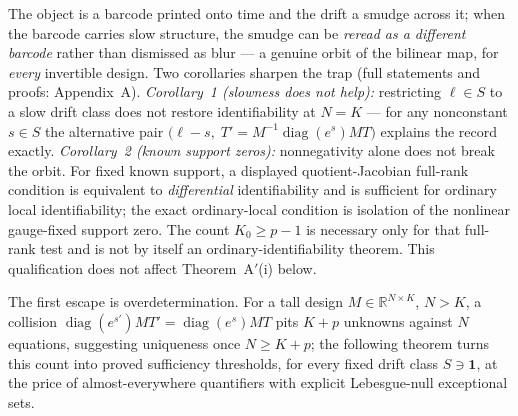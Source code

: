 The object is a barcode printed onto time and the drift a smudge across it; when the barcode carries slow structure, the smudge can be \emph{reread as a different barcode} rather than dismissed as blur --- a genuine orbit of the bilinear map, for \emph{every} invertible design. Two corollaries sharpen the trap (full statements and proofs: Appendix~A). \emph{Corollary~1 (slowness does not help):} restricting $\ell\in S$ to a slow drift class does not restore identifiability at $N=K$ --- for any nonconstant $s\in S$ the alternative pair $\big(\ell-s,\; T'=M^{-1}\operatorname{diag}(e^{s})MT\big)$ explains the record exactly. \emph{Corollary~2 (known support zeros):} nonnegativity alone does not break the orbit. For fixed known support, a displayed quotient-Jacobian full-rank condition is equivalent to \emph{differential} identifiability and is sufficient for ordinary local identifiability; the exact ordinary-local condition is isolation of the nonlinear gauge-fixed support zero. The count $K_0\ge p-1$ is necessary only for that full-rank test and is not by itself an ordinary-identifiability theorem. This qualification does not affect Theorem~A$'$(i) below.

The first escape is overdetermination. For a tall design $M\in\mathbb R^{N\times K}$, $N>K$, a collision $\operatorname{diag}(e^{s'})MT'=\operatorname{diag}(e^{s})MT$ pits $K+p$ unknowns against $N$ equations, suggesting uniqueness once $N\ge K+p$; the following theorem turns this count into proved sufficiency thresholds, for every fixed drift class $S\ni\mathbf 1$, at the price of almost-everywhere quantifiers with explicit Lebesgue-null exceptional sets.

